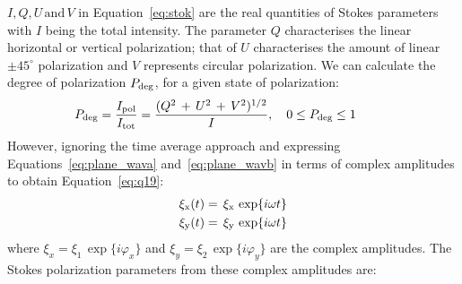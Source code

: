 %  
\noindent  $I, Q, U\, \textrm{and}\, V$ in Equation~\ref{eq:stok} are the real quantities of Stokes parameters with $I$ being the total intensity. 
 The parameter $Q$ characterises the linear horizontal or vertical polarization; that of $U$ characterises the amount of linear $\pm 45^\circ$ polarization 
 and $V$ represents circular polarization. We can calculate the degree of polarization $P_{\rm {deg}}$, for a given state of polarization:
\begin{equation}
  \begin{aligned}
   P_{\rm deg} = \frac{I_{\rm pol}}{I_{\rm tot}} = \frac{(Q^2 \, + \, U^2 \, + \, V^2)^{1/2}}{I}, \quad 0 \leq P_{\rm deg} \leq 1
  \end{aligned}
   \phantom{\hspace{1cm}}
  \label{eq:q18}
 \end{equation} 
However, ignoring the time average approach and expressing Equations~\ref{eq:plane_wava} and~\ref{eq:plane_wavb} in terms of complex amplitudes to obtain Equation~\ref{eq:q19}:
% 
\begin{subequations}
\begin{align}
\xi_{\rm x}(t) & =\, \xi_{\rm x}\, \exp\{i\omega t \}   \label{eq:q19a} \\
\xi_{\rm y}(t) & =\, \xi_{\rm y}\, \exp\{i\omega t \} 	\label{eq:q19b}
\end{align}
\label{eq:q19}
\end{subequations}
where $\xi_{x} = \xi_{1}\, \exp\{i \varphi_{x} \}$ and $\xi_{y} = \xi_{2}\, \exp\{i \varphi_{y} \}$ are  the complex amplitudes. 
The Stokes polarization parameters from these complex amplitudes are:
